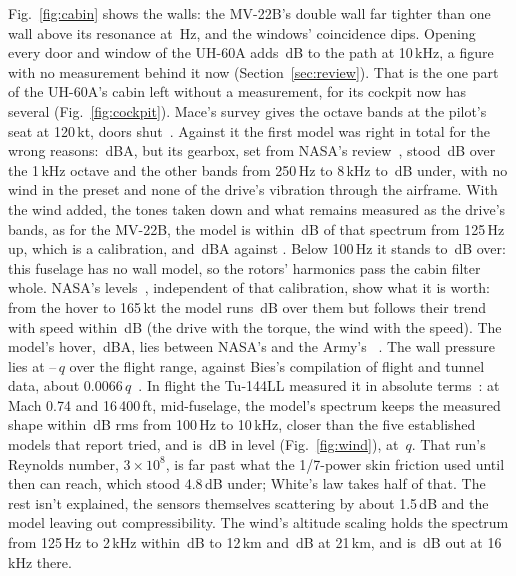 \documentclass[10pt,a4paper,twocolumn]{article}
\begin{document}
Fig.~\ref{fig:cabin} shows the walls: the MV-22B's double wall far tighter than one wall above its resonance at \NCaResonance\,Hz, and the windows' coincidence dips. Opening every door and window of the UH-60A adds \NCaDoor\,dB to the path at 10\,kHz, a figure with no measurement behind it now (Section~\ref{sec:review}). That is the one part of the UH-60A's cabin left without a measurement, for its cockpit now has several (Fig.~\ref{fig:cockpit}). Mace's survey gives the octave bands at the pilot's seat at 120\,kt, doors shut~\cite{usaarl}. Against it the first model was right in total for the wrong reasons: \NCkOldCruise\,dBA, but its gearbox, set from NASA's review~\cite{review}, stood \NCkOldTone\,dB over the 1\,kHz octave and the other bands from 250\,Hz to 8\,kHz \NCkOldUnderLo{} to \NCkOldUnderHi\,dB under, with no wind in the preset and none of the drive's vibration through the airframe. With the wind added, the tones taken down and what remains measured as the drive's bands, as for the MV-22B, the model is within \NCkBandMax\,dB of that spectrum from 125\,Hz up, which is a calibration, and \NCkCruise\,dBA against \NCkPilot. Below 100\,Hz it stands \NCkLowLo{} to \NCkLowHi\,dB over: this fuselage has no wall model, so the rotors' harmonics pass the cabin filter whole. NASA's levels~\cite{tm84664}, independent of that calibration, show what it is worth: from the hover to 165\,kt the model runs \NCkNasaMean\,dB over them but follows their trend with speed within \NCkNasaSd\,dB (the drive with the torque, the wind with the speed). The model's hover, \NCkHover\,dBA, lies between NASA's \NCkNasaHover{} and the Army's \NCkArmy~\cite{nas}. The wall pressure lies at \NWiLo--\NWiHi\,$q$ over the flight range, against Bies's compilation of flight and tunnel data, about 0.0066\,$q$~\cite{bies}. In flight the Tu-144LL measured it in absolute terms~\cite{tu144}: at Mach 0.74 and 16\,400\,ft, mid-fuselage, the model's spectrum keeps the measured shape within \NWiTuShape\,dB rms from 100\,Hz to 10\,kHz, closer than the five established models that report tried, and is \NWiTuMean\,dB in level (Fig.~\ref{fig:wind}), at \NWiTuQ\,$q$. That run's Reynolds number, $3\times10^8$, is far past what the 1/7-power skin friction used until then can reach, which stood 4.8\,dB under; White's law takes half of that. The rest isn't explained, the sensors themselves scattering by about 1.5\,dB and the model leaving out compressibility. The wind's altitude scaling holds the spectrum from 125\,Hz to 2\,kHz within \NWiAltA\,dB to 12\,km and \NWiAltB\,dB at 21\,km, and is \NWiAltTop\,dB out at 16\,kHz there.
\end{document}
